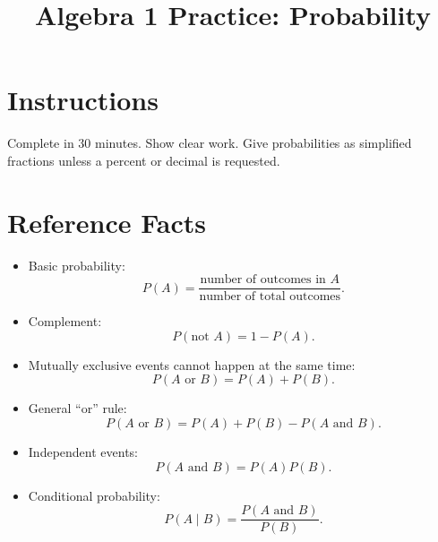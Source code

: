 \documentclass[12pt]{article}
\title{Algebra 1 Practice: Probability}
\author{}
\date{}
\begin{document}
\maketitle

\section*{Instructions}
Complete in 30 minutes. Show clear work. Give probabilities as simplified fractions unless a percent or decimal is requested.

\section*{Reference Facts}
\begin{itemize}[leftmargin=1.5em]
  \item Basic probability:
  \[
  P(A)=\frac{\text{number of outcomes in }A}{\text{number of total outcomes}}.
  \]
  \item Complement:
  \[
  P(\text{not }A)=1-P(A).
  \]
  \item Mutually exclusive events cannot happen at the same time:
  \[
  P(A\text{ or }B)=P(A)+P(B).
  \]
  \item General ``or'' rule:
  \[
  P(A\text{ or }B)=P(A)+P(B)-P(A\text{ and }B).
  \]
  \item Independent events:
  \[
  P(A\text{ and }B)=P(A)P(B).
  \]
  \item Conditional probability:
  \[
  P(A\mid B)=\frac{P(A\text{ and }B)}{P(B)}.
  \]
\end{itemize}
\end{document}
